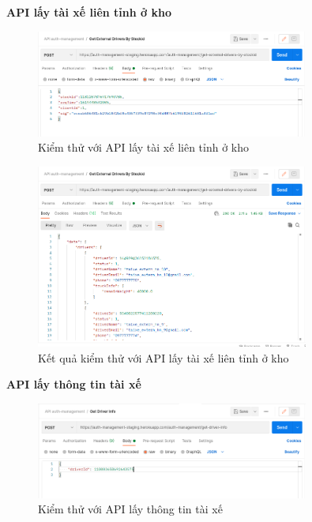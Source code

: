 		\newpage
		
		\textbf{API lấy tài xế liên tỉnh ở kho}
		
		\begin{figure}[!ht]
			\includegraphics[width=0.8\textwidth]{Images/testing/API-get-driver-external-warehouse.png}
			\centering
			\linebreak
			\caption{Kiểm thử với API lấy tài xế liên tỉnh ở kho}
		\end{figure}
		
		\begin{figure}[!ht]
			\includegraphics[width=0.8\textwidth]{Images/testing/API-get-driver-external-warehouse-result.png}
			\centering
			\linebreak
			\caption{Kết quả kiểm thử với API lấy tài xế liên tỉnh ở kho}
		\end{figure}
		
		\newpage
		
		\textbf{API lấy thông tin tài xế}
		
		\begin{figure}[!ht]
			\includegraphics[width=0.8\textwidth]{Images/testing/API-get-driver-info.png}
			\centering
			\linebreak
			\caption{Kiểm thử với API lấy thông tin tài xế}
		\end{figure}
		
